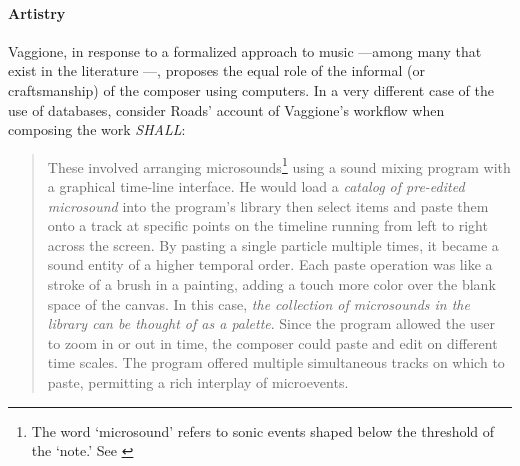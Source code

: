 




\paragraph{Artistry}
Vaggione, in response to a formalized approach to music ---among many that exist in the literature \parencite{Hil59:Exp, Xen92:For, Tru76:ACo, Ari05:Ano}---, proposes the equal role of the informal (or craftsmanship) of the composer using computers. In a very different case of the use of databases, consider Roads' account of Vaggione's workflow when composing the work \textit{SHALL}:

\begin{quote}
	These involved arranging microsounds\footnote{The word `microsound' refers to sonic events shaped below the threshold of the `note.' See \parencite{Roa04:Mic}} using a sound mixing program with a graphical time-line interface. He would load a \textit{catalog of pre-edited microsound} into the program's library then select items and paste them onto a track at specific points on the timeline running from left to right across the screen. By pasting a single particle multiple times, it became a sound entity of a higher temporal order. Each paste operation was like a stroke of a brush in a painting, adding a touch more color over the blank space of the canvas. In this case, \textit{the collection of microsounds in the library can be thought of as a palette}. Since the program allowed the user to zoom in or out in time, the composer could paste and edit on different time scales. The program offered multiple simultaneous tracks on which to paste, permitting a rich interplay of microevents. \im \parencite[313-314]{Roa04:Mic}
\end{quote}

